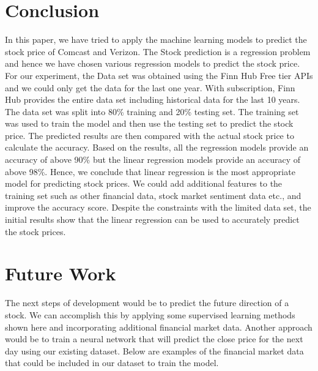 \documentclass[conference]{IEEEtran}
\begin{document}
\section{Conclusion}

In this paper, we have tried to apply the machine learning models to predict the stock price of Comcast and Verizon.
The Stock prediction is a regression problem and hence we have chosen various regression models to predict the stock price.
For our experiment, the Data set was obtained using the Finn Hub Free tier APIs and we could only get the data for the last one year.
With subscription, Finn Hub provides the entire data set including historical data for the last 10 years. The data set was split into 80\% training and 20\% testing set.
The training set was used to train the model and then use the testing set to predict the stock price. The predicted results are then compared with the actual stock price to calculate the accuracy. Based on the results, all the regression models provide an accuracy of above 90\% but the linear regression models provide an accuracy of above 98\%.
Hence, we conclude that linear regression is the most appropriate model for predicting stock prices.
We could add additional features to the training set such as other financial data, stock market sentiment data etc., and improve the accuracy score. Despite the constraints with the limited data set, the initial results show that the linear regression can be used to accurately predict the stock prices.

\section{Future Work}
The next steps of development would be to predict the future direction of a stock.
We can accomplish this by applying some supervised learning methods shown here and incorporating additional financial market data.
Another approach would be to train a neural network that will predict the close price for the next day using our existing dataset. \cite{b1}
Below are examples of the financial market data that could be included in our dataset to train the model.
\end{document}
